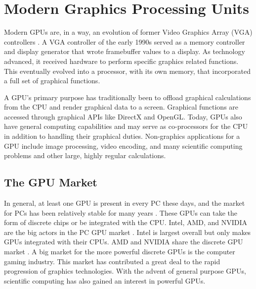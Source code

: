 \documentclass[../main/report.tex]{subfiles}
\begin{document}
\section{Modern Graphics Processing Units}


Modern GPUs are, in a way, an evolution of former Video Graphics Array (VGA) controllers \cite{gpu_appendix}.
A VGA controller of the early 1990s served as a memory controller and display generator that wrote framebuffer values to a display.
As technology advanced, it received hardware to perform specific graphics related functions.
This eventually evolved into a processor, with its own memory, that incorporated a full set of graphical functions.

A GPU's primary purpose has traditionally been to offload graphical calculations from the CPU and render graphical data to a screen.
Graphical functions are accessed through graphical APIs like DirectX and OpenGL.
Today, GPUs also have general computing capabilities and may serve as co-processors for the CPU in addition to handling their graphical duties.
Non-graphics applications for a GPU include image processing, video encoding, and many scientific computing problems and other large, highly regular calculations.


\subsection{The GPU Market}




In general, at least one GPU is present in every PC these days, and the market for PCs has been relatively stable for many years \cite{pc_sales}.
These GPUs can take the form of discrete chips or be integrated with the CPU.
Intel, AMD, and NVIDIA are the big actors in the PC GPU market \cite{gpu_overall_sales}.
Intel is largest overall but only makes GPUs integrated with their CPUs.
AMD and NVIDIA share the discrete GPU market \cite{gpu_discrete_sales}.
A big market for the more powerful discrete GPUs is the computer gaming industry.
This market has contributed a great deal to the rapid progression of graphics technologies.
With the advent of general purpose GPUs, scientific computing has also gained an interest in powerful GPUs.
\end{document}
